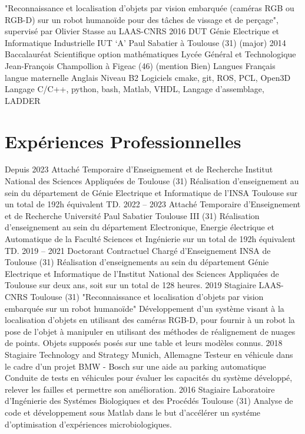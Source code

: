 \documentclass[11pt,a4paper,sans]{moderncv}         %
\begin{document}
{}
{
  "Reconnaissance et localisation d’objets par vision embarqu\'ee (cam\'eras RGB ou RGB-D) sur un robot humano\"ide pour des t\^aches de vissage et de per\c cage", supervis\'e par Olivier Stasse au LAAS-CNRS
}
%
\cventry
{2016}
{DUT G\'enie Electrique et Informatique Industrielle}
{IUT `A' Paul Sabatier}
{\`a Toulouse (31)}
{(major)}
{}
%
\cventry
{2014}
{Baccalaur\'eat Scientifique option math\'ematiques}
{Lyc\'ee G\'en\'eral et Technologique Jean-Fran\c cois Champollion}
{\`a Figeac (46)}
{(mention Bien)}
{}
%
\vspace*{0.5cm}
\cventry
{Langues}
{Fran\c cais}
{langue maternelle}
{}
{}
{}
%
\cventry
{}
{Anglais}
{Niveau B2}
{}
{}
{}
%
{Logiciels}
{cmake, git, ROS, PCL, Open3D}
{}
{}
{}
%
\cventry
{}
{Langage}
{C/C++, python, bash, Matlab, VHDL, Langage d'assemblage, LADDER}
{}
{}
{}
%

\section{Exp\'eriences Professionnelles}\label{exp-professionnelles}
\cventry
{Depuis 2023}
{Attach\'e Temporaire d'Enseignement et de Recherche}
{Institut National des Sciences Appliqu\'ees de Toulouse (31)}
{}
{}
{
  R\'ealisation d'enseignement au sein du d\'epartement de G\'enie Electrique et Informatique de l'INSA Toulouse sur un total de 192h \'equivalent TD.
}
%
\cventry
{2022 -- 2023}
{Attach\'e Temporaire d'Enseignement et de Recherche}
{Universit\'e Paul Sabatier Toulouse III (31)}
{}
{}
{
  R\'ealisation d'enseignement au sein du d\'epartement Electronique, Energie \'electrique et Automatique de la Facult\'e Sciences et Ing\'enierie sur un total de 192h \'equivalent TD.
}
%
\cventry
{2019 -- 2021}
{Doctorant Contractuel Charg\'e d'Enseignement}
{INSA de Toulouse (31)}
{}
{}
{
  R\'ealisation d'enseignements au sein du d\'epartement G\'enie Electrique et Informatique de l'Institut National des Sciences Appliqu\'ees de Toulouse sur deux ans, soit sur un total de 128 heures.
}
%
\cventry
{2019}
{Stagiaire}
{LAAS-CNRS}
{Toulouse (31)}
{"Reconnaissance et localisation d'objets par vision embarqu\'ee sur un robot humano\"ide"}
{
  D\'eveloppement d'un syst\`eme visant \`a la localisation d'objets en utilisant des cam\'eras RGB-D, pour fournir \`a un robot la pose de l'objet \`a manipuler en utilisant des m\'ethodes de r\'ealignement de nuages de points.
  Objets suppos\'es pos\'es sur une table et leurs mod\`eles connus.
}
%
%
\cventry
{2018}
{Stagiaire}
{Technology and Strategy}
{Munich, Allemagne}
{Testeur en v\'ehicule dans le cadre d'un projet BMW - Bosch sur une aide au parking automatique}
{
  Conduite de tests en v\'ehicules pour \'evaluer les capacit\'es du syst\`eme d\'evelopp\'e, relever les failles et permettre son am\'elioration.
}
%
%
\cventry
{2016}
{Stagiaire}
{Laboratoire d'Ing\'enierie des Syst\'emes Biologiques et des Proc\'ed\'es}
{Toulouse (31)}
{}
{
  Analyse de code et d\'eveloppement sous Matlab dans le but d'acc\'el\'erer un syst\'eme d'optimisation d'exp\'eriences microbiologiques.
}
%
\end{document}
